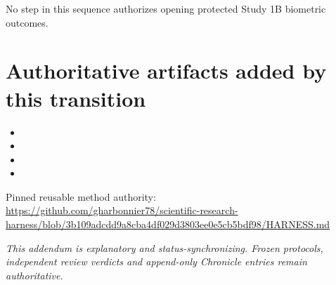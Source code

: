 \documentclass[10pt,a4paper]{article}
\begin{document}
No step in this sequence authorizes opening protected Study 1B biometric outcomes.

\section{Authoritative artifacts added by this transition}

\begin{itemize}
\item {}
\item {}
\item {}
\item {}
\end{itemize}

Pinned reusable method authority:\\
\url{https://github.com/gharbonnier78/scientific-research-harness/blob/3b109adcdd9a8cba4df029d3803ee0e5cb5bdf98/HARNESS.md}

\vfill
\begin{center}
\small\textit{This addendum is explanatory and status-synchronizing. Frozen protocols, independent review verdicts and
append-only Chronicle entries remain authoritative.}
\end{center}
\end{document}
